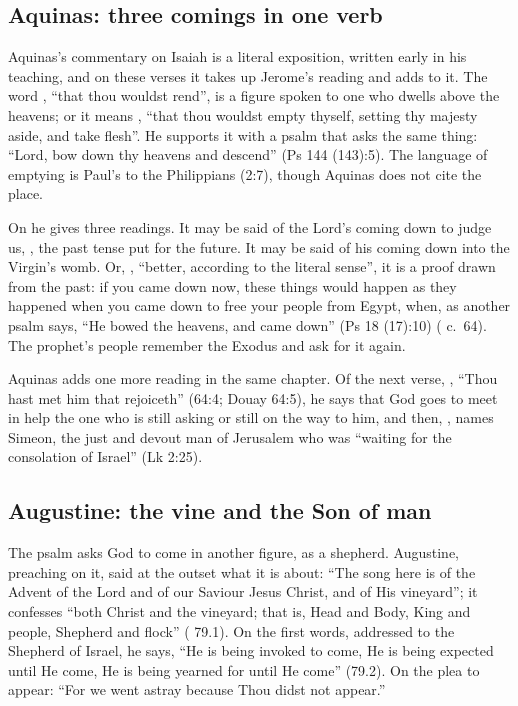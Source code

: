 \subsection{Aquinas: three comings in one verb}

Aquinas's commentary on Isaiah is a literal exposition, written early in his
teaching, and on these verses it takes up Jerome's reading and adds to it.
The word , ``that thou wouldst rend'', is a figure spoken to
one who dwells above the heavens; or it means , ``that thou wouldst empty
thyself, setting thy majesty aside, and take flesh''. He supports it with a
psalm that asks the same thing: ``Lord, bow down thy heavens and descend''
(Ps 144 (143):5). The language of emptying is Paul's to the Philippians (2:7),
though Aquinas does not cite the place.

On  he gives three readings. It may be said of the Lord's
coming down to judge us, , the past tense put
for the future. It may be said
of his coming down into the Virgin's womb. Or, , ``better, according to the literal sense'', it is a proof
drawn from the past: if you came down now, these things would happen as they
happened when you came down to free your people from Egypt, when, as another
psalm says, ``He bowed the heavens, and came down'' (Ps 18 (17):10)
( c.~64). The prophet's people remember the
Exodus and ask for it again.

Aquinas adds one more reading in the same chapter. Of the next verse,
, ``Thou hast met him that rejoiceth'' (64:4;
Douay 64:5), he says that God goes to meet in help the one who is still
asking or still on the way to him, and then, , names Simeon,
the just and devout man of Jerusalem who was ``waiting for the consolation of
Israel'' (Lk 2:25).

\subsection{Augustine: the vine and the Son of man}

The psalm asks God to come in another figure, as a shepherd. Augustine, preaching on
it, said at the outset what it is about: ``The song here is of the Advent of
the Lord and of our Saviour Jesus Christ, and of His vineyard''; it confesses
``both Christ and the vineyard; that is, Head and Body, King and people,
Shepherd and flock'' ( 79.1).
On the first words, addressed to the Shepherd of Israel, he says, ``He is
being invoked to come, He is being expected until He come, He is being
yearned for until He come'' (79.2). On the plea to appear: ``For we went
astray because Thou didst not appear.''

